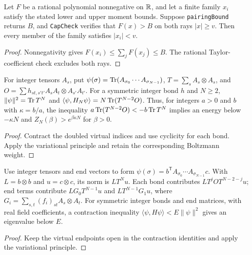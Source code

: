 \begin{lemma}
  \label{lem:seed-filter}
  \leanok
  Let \(F\) be a rational polynomial nonnegative on \(\mathbb{R}\), and let a finite family \(x_i\)
  satisfy the stated lower and upper moment bounds.
  Suppose \texttt{pairingBound} returns \(B\), and \texttt{CapCheck} verifies that
  \(F(x)>B\) on both rays \(|x|\ge v\).
  Then every member of the family satisfies \(|x_i|<v\).
\end{lemma}
\begin{proof}
  \leanok
  Nonnegativity gives \(F(x_i)\le\sum_jF(x_j)\le B\).
  The rational Taylor-coefficient check excludes both rays.
\end{proof}

\begin{lemma}
  \label{lem:mps-variational}
  \leanok
  For integer tensors \(A_s\), put
  \(\psi(\sigma)=\operatorname{Tr}(A_{\sigma_0}\cdots A_{\sigma_{N-1}})\),
  \(T=\sum_sA_s\otimes A_s\), and
  \(O=\sum h_{st,s't'}A_sA_t\otimes A_{s'}A_{t'}\).
  For a symmetric integer bond \(h\) and \(N\ge2\),
  \(\|\psi\|^2=\operatorname{Tr} T^N\) and
  \(\langle\psi,H_N\psi\rangle=N\operatorname{Tr}(T^{N-2}O)\).
  Thus, for integers \(a>0\) and \(b\) with \(\kappa=b/a\), the inequality
  \(a\operatorname{Tr}(T^{N-2}O)<-b\operatorname{Tr} T^N\) implies an energy below \(-\kappa N\)
  and \(Z_N(\beta)>e^{\beta\kappa N}\) for \(\beta>0\).
\end{lemma}
\begin{proof}
  \leanok
  Contract the doubled virtual indices and use cyclicity for each bond.
  Apply the variational principle and retain the corresponding Boltzmann weight.
\end{proof}

\begin{lemma}
  \label{lem:open-mps-variational}
  \leanok
  Use integer tensors and end vectors to form
  \(\psi(\sigma)=b^{\mathsf T}A_{\sigma_0}\cdots A_{\sigma_{N-1}}c\).
  With \(L=b\otimes b\) and \(u=c\otimes c\), its norm is \(LT^Nu\).
  Each bond contributes \(LT^jOT^{N-2-j}u\); end terms contribute
  \(LG_0T^{N-1}u\) and \(LT^{N-1}G_1u\), where
  \(G_i=\sum_{s,t}(f_i)_{st}A_s\otimes A_t\).
  For symmetric integer bonds and end matrices, with real field coefficients, a contraction
  inequality \(\langle\psi,H\psi\rangle<E\|\psi\|^2\) gives an eigenvalue below \(E\).
\end{lemma}
\begin{proof}
  \leanok
  Keep the virtual endpoints open in the contraction identities and apply the variational
  principle.
\end{proof}

